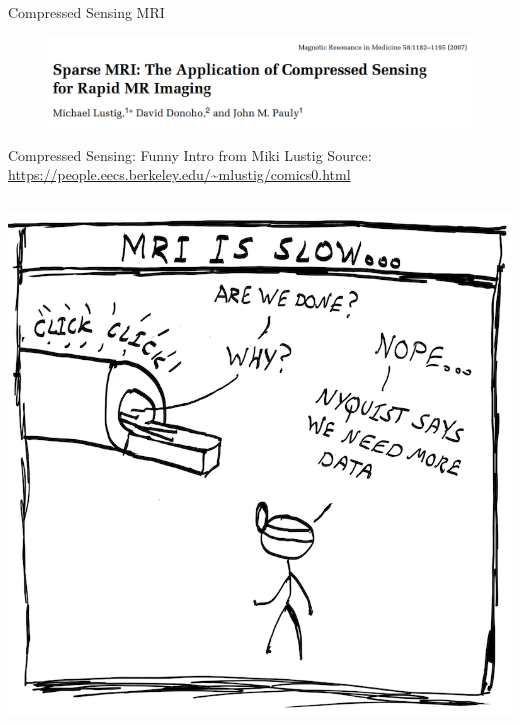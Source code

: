 \documentclass[aspectratio=169]{beamer}
\begin{document}
	\begin{frame}{Compressed Sensing MRI}
		\begin{figure}
			\centering
			\includegraphics[width=\textwidth]{figures/cs-lustig.png}
		\end{figure}
	\end{frame}
	
	\begin{frame}{Compressed Sensing: Funny Intro from Miki Lustig}
		Source: \url{https://people.eecs.berkeley.edu/~mlustig/comics0.html}
		\vspace{1em}
		\begin{columns}
			\centering
			\includegraphics[width=\columnwidth]{figures/cs-lustig-comics-01.png}
			

\end{columns}
\end{frame}
\end{document}
